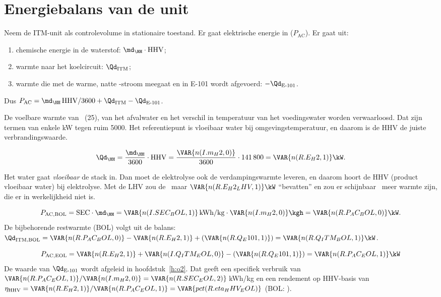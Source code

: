 \section{Energiebalans van de unit}
\begin{methode}[– Cengel H5 + H15]
Neem de ITM-unit als controlevolume in stationaire toestand. Er gaat elektrische energie in ($P_\mathrm{AC}$).
Er gaat uit:
\begin{enumerate}
\item chemische energie in de waterstof: $\md_{\HH}\cdot\mathrm{HHV}$;
\item warmte naar het koelcircuit: $\Qd_\mathrm{ITM}$;
\item warmte die met de warme, natte \OO-stroom meegaat en in E-101 wordt afgevoerd: $-\Qd_{\text{E-101}}$.
\end{enumerate}
Dus $P_\mathrm{AC} = \md_{\HH}\,\mathrm{HHV}/3600 + \Qd_\mathrm{ITM} - \Qd_{\text{E-101}}$.
\end{methode}
\begin{aanname}
De voelbare warmte van \HH\ (25\degC), van het afvalwater en het verschil in temperatuur van het voedingswater worden
verwaarloosd. Dat zijn termen van enkele kW tegen ruim 5000\kW. Het referentiepunt is vloeibaar water bij
omgevingstemperatuur, en daarom is de HHV de juiste verbrandingswaarde.
\end{aanname}

\[
\Qd_{\HH} = \frac{\md_{\HH}}{3600}\cdot\mathrm{HHV} = \frac{\VAR{n(I.m_H2,0)}}{3600}\cdot 141\,800 = \VAR{n(R.E_H2,1)}\kW .
\]
\begin{waarom}
Het water gaat \emph{vloeibaar} de stack in. Dan moet de elektrolyse ook de verdampingswarmte leveren, en daarom
hoort de HHV (product vloeibaar water) bij elektrolyse. Met de LHV zou de \HH\ maar
$\VAR{n(R.E_H2_LHV,1)}\kW$ ``bevatten'' en zou er schijnbaar \kW\ meer
warmte zijn, die er in werkelijkheid niet is.
\end{waarom}

\[
P_\mathrm{AC,BOL} = \mathrm{SEC}\cdot \md_{\HH} = \VAR{n(I.SEC_BOL,1)}\,\mathrm{kWh/kg}\cdot\VAR{n(I.m_H2,0)}\kgh = \VAR{n(R.P_AC_BOL,0)}\kW .
\]
De bijbehorende restwarmte (BOL) volgt uit de balans:
$\Qd_\mathrm{ITM,BOL} = \VAR{n(R.P_AC_BOL,0)} - \VAR{n(R.E_H2,1)} + (\VAR{n(R.Q_E101,1)}) = \VAR{n(R.Q_ITM_BOL,1)}\kW$.

\[
P_\mathrm{AC,EOL} = \VAR{n(R.E_H2,1)} + \VAR{n(I.Q_ITM_EOL,0)} - (\VAR{n(R.Q_E101,1)}) = \VAR{n(R.P_AC_EOL,1)}\kW
\]
De waarde van $\Qd_{\text{E-101}}$ wordt afgeleid in hoofdstuk~\ref{h:o2}.
Dat geeft een specifiek verbruik van $\VAR{n(R.P_AC_EOL,1)}/\VAR{n(I.m_H2,0)} = \VAR{n(R.SEC_EOL,2)}$\,kWh/kg en een
rendement op HHV-basis van $\eta_\mathrm{HHV} = \VAR{n(R.E_H2,1)}/\VAR{n(R.P_AC_EOL,1)} = \VAR{pct(R.eta_HHV_EOL)}$
(BOL: ).


